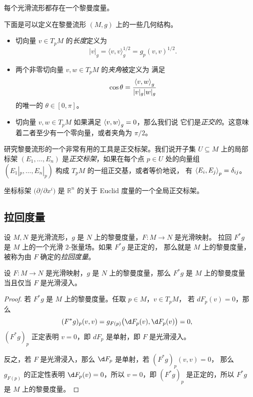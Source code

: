 \begin{proposition}[黎曼度量的存在性]
  每个光滑流形都存在一个黎曼度量。
\end{proposition}

下面是可以定义在黎曼流形 $(M,g)$ 上的一些几何结构。
\begin{itemize}[noitemsep]
  \item 切向量 $v\in T_pM$ 的\emph{长度}定义为
  \[
    |v|_g=\langle v,v\rangle_g^{1/2}=g_p(v,v)^{1/2}.  
  \]
  \item 两个非零切向量 $v,w\in T_pM$ 的\emph{夹角}被定义为
  满足
  \[
    \cos\theta=\frac{\left\langle v,w\right\rangle_g}{|v|_g|w|_g}
  \]
  的唯一的 $\theta\in [0,\pi]$。
  \item 切向量 $v,w\in T_pM$ 如果满足 $\left\langle v,w\right\rangle_g=0$，那么我们说
  它们是\emph{正交的}。这意味着二者至少有一个零向量，或者夹角为 $\pi/2$。
\end{itemize}

研究黎曼流形的一个非常有用的工具是正交标架。我们说开子集 $U\subseteq M$
上的局部标架 $(E_1,\dots,E_n)$ 是\emph{正交标架}，如果在每个点 $p\in U$
处的向量组 $(E_1|_p,\dots,E_n|_p)$ 构成 $T_pM$ 的一组正交基，或者等价地说，
有 $\left\langle E_i,E_j\right\rangle_p=\delta_{ij}$。

\begin{example}
  坐标标架 $\bigl(\partial/\partial x^i\bigr)$ 是 $\mathbb{R}^n$
  的关于 Euclid 度量的一个全局正交标架。
\end{example}


\subsection{拉回度量}

设 $M,N$ 是光滑流形，$g$ 是 $N$ 上的黎曼度量，$F:M\to N$ 是光滑映射。
拉回 $F^*g$ 是 $M$ 上的一个光滑 $2$-张量场。如果 $F^*g$ 是正定的，
那么就是 $M$ 上的黎曼度量，被称为由 $F$ 确定的\emph{拉回度量}。

\begin{proposition}[拉回度量判别法]
  设 $F:M\to N$ 是光滑映射，$g$ 是 $N$ 上的黎曼度量，那么 
  $F^*g$ 是 $M$ 上的黎曼度量当且仅当 $F$ 是光滑浸入。
\end{proposition}
\begin{proof}
  若 $F^*g$ 是 $M$ 上的黎曼度量。任取 $p\in M$，$v\in T_pM$，
  若 $dF_p(v)=0$，那么
  \[
    (F^*g)_p(v,v)=g_{F(p)}\bigl(\d F_p(v),\d F_p(v)\bigr)  =0,
  \]
  $(F^*g)_p$ 正定表明 $v=0$，即 $dF_p$ 是单射，即 $F$ 是光滑浸入。

  反之，若 $F$ 是光滑浸入，那么 $\d F_p$ 是单射，若 $(F^*g)_p(v,v)=0$，
  那么 $g_{F(p)}$ 的正定性表明 $\d F_p(v)=0$，所以 $v=0$，即
  $(F^*g)_p$ 是正定的，所以 $F^*g$ 是 $M$ 上的黎曼度量。
\end{proof}

